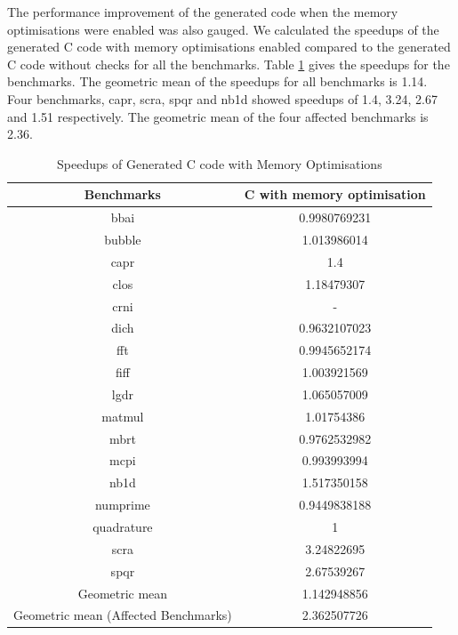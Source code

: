 The performance improvement of the generated code when the memory optimisations were enabled was also gauged. We calculated the speedups of the generated C code with memory optimisations enabled compared to the generated C code without checks for all the benchmarks. Table \ref{tab:cmvscwo} gives the speedups for the benchmarks. The geometric mean of the speedups for all benchmarks is 1.14. Four benchmarks, capr, scra, spqr and nb1d showed speedups of 1.4, 3.24, 2.67 and 1.51 respectively. The geometric mean of the four affected benchmarks is 2.36. 
\begin{table}[htbp]
\centering
\begin{tabular}{|c|c|}
\hline
Benchmarks                           & C with memory optimisation \\ \hline
bbai                                 & 0.9980769231               \\ \hline
bubble                               & 1.013986014                \\ \hline
capr                                 & 1.4                        \\ \hline
clos                                 & 1.18479307                 \\ \hline
crni                                 & -                          \\ \hline
dich                                 & 0.9632107023               \\ \hline
fft                                  & 0.9945652174               \\ \hline
fiff                                 & 1.003921569                \\ \hline
lgdr                                 & 1.065057009                \\ \hline
matmul                               & 1.01754386                 \\ \hline
mbrt                                 & 0.9762532982               \\ \hline
mcpi                                 & 0.993993994                \\ \hline
nb1d                                 & 1.517350158                \\ \hline
numprime                             & 0.9449838188               \\ \hline
quadrature                           & 1                          \\ \hline
scra                                 & 3.24822695                 \\ \hline
spqr                                 & 2.67539267                 \\ \hline
Geometric mean                       & 1.142948856                \\ \hline
Geometric mean (Affected Benchmarks) & 2.362507726                \\ \hline
\end{tabular}
\caption{Speedups of Generated C code with Memory Optimisations}
\label{tab:cmvscwo}
\end{table}


